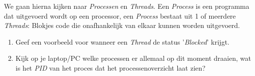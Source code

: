 We gaan hierna kijken naar \textit{Processen} en \textit{Threads}. Een \textit{Process} is een programma dat uitgevoerd wordt op een processor, een \textit{Process} bestaat uit 1 of meerdere \textit{Threads}: Blokjes code die onafhankelijk van elkaar kunnen worden uitgevoerd.


\begin{opdracht}
    \begin{minipage}[t]{0.9\linewidth}
        \begin{enumerate}
        \item [A] Geef een voorbeeld voor wanneer een \textit{Thread} de status '\textit{Blocked}' krijgt.
        \item [B] Kijk op je laptop/PC welke processen er allemaal op dit moment draaien, wat is het \textit{PID} van het proces dat het processenoverzicht laat zien? 
        \end{enumerate}
    \end{minipage}
\end{opdracht}
